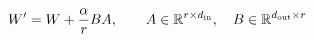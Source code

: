 \documentclass[border=3pt]{standalone}
\begin{document}
\color{ink}\fontsize{23}{28}\selectfont
$\displaystyle W^{\prime}=W+\frac{\alpha}{r}BA,\qquad A\in\mathbb{R}^{r\times d_{\rm in}},\quad B\in\mathbb{R}^{d_{\rm out}\times r}$
\end{document}
